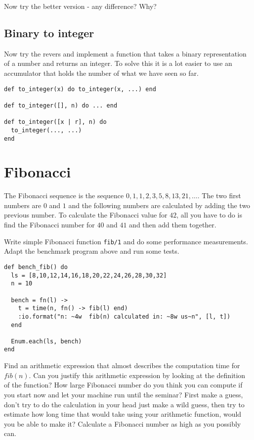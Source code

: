\documentclass[a4paper,11pt]{article}
\begin{document}
Now try the better version - any difference? Why?

\subsection{Binary to integer}

Now try the revers and implement a function that takes a binary
representation of a number and returns an integer. To solve this it is
a lot easier to use an accumulator that holds the number of what we
have seen so far.

\begin{verbatim}
def to_integer(x) do to_integer(x, ...) end

def to_integer([], n) do ... end

def to_integer([x | r], n) do
  to_integer(..., ...)
end
\end{verbatim}



\section{Fibonacci}

The Fibonacci sequence is the sequence $0,1,1,2,3,5,8,13,21,
\ldots$. The two first numbers are $0$ and $1$ and the following
numbers are calculated by adding the two previous number. To calculate
the Fibonacci value for $42$, all you have to do is find the Fibonacci
number for $40$ and $41$ and then add them together.

Write simple Fibonacci function {\tt fib/1} and do some performance
measurements. Adapt the benchmark program above and run some tests.

\begin{verbatim}
def bench_fib() do
  ls = [8,10,12,14,16,18,20,22,24,26,28,30,32]
  n = 10
  
  bench = fn(l) ->
    t = time(n, fn() -> fib(l) end)
    :io.format("n: ~4w  fib(n) calculated in: ~8w us~n", [l, t])
  end
  
  Enum.each(ls, bench)
end
\end{verbatim}

Find an arithmetic expression that almost describes the computation
time for $fib(n)$. Can you justify this arithmetic expression by
looking at the definition of the function?  How large Fibonacci number
do you think you can compute if you start now and let your machine run
until the seminar? First make a guess, don't try to do the calculation
in your head just make a wild guess, then try to estimate how long
time that would take using your arithmetic function, would you be able
to make it? Calculate a Fibonacci number as high as you possibly can.
\end{document}
